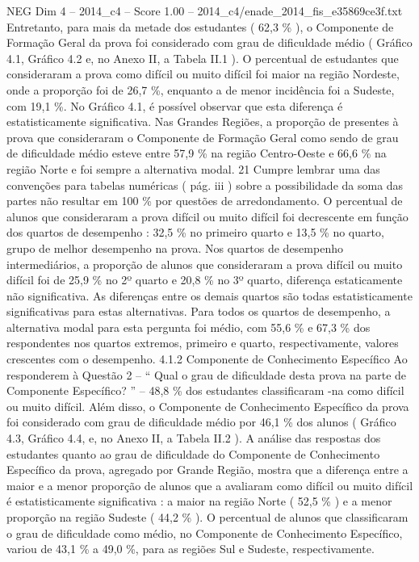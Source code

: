 \begin{textsample}{NEG Dim 4 – 2014\_c4 – Score 1.00 – 2014\_c4/enade\_2014\_fis\_e35869ce3f.txt}
Entretanto, para mais da metade dos estudantes ( 62,3 \% ), o Componente de Formação Geral da prova foi considerado com grau de dificuldade médio ( Gráfico 4.1, Gráfico 4.2 e, no Anexo II, a Tabela II.1 ).
O percentual de estudantes que consideraram a prova como difícil ou muito difícil foi maior na região Nordeste, onde a proporção foi de 26,7 \%, enquanto a de menor incidência foi a Sudeste, com 19,1 \%.
No Gráfico 4.1, é possível observar que esta diferença é estatisticamente significativa.
Nas Grandes Regiões, a proporção de presentes à prova que consideraram o Componente de Formação Geral como sendo de grau de dificuldade médio esteve entre 57,9 \% na região Centro-Oeste e 66,6 \% na região Norte e foi sempre a alternativa modal. 21 Cumpre lembrar uma das convenções para tabelas numéricas ( pág. iii ) sobre a possibilidade da soma das partes não resultar em 100 \% por questões de arredondamento.
O percentual de alunos que consideraram a prova difícil ou muito difícil foi decrescente em função dos quartos de desempenho : 32,5 \% no primeiro quarto e 13,5 \% no quarto, grupo de melhor desempenho na prova.
Nos quartos de desempenho intermediários, a proporção de alunos que consideraram a prova difícil ou muito difícil foi de 25,9 \% no 2º quarto e 20,8 \% no 3º quarto, diferença estaticamente não significativa.
As diferenças entre os demais quartos são todas estatisticamente significativas para estas alternativas.
Para todos os quartos de desempenho, a alternativa modal para esta pergunta foi médio, com 55,6 \% e 67,3 \% dos respondentes nos quartos extremos, primeiro e quarto, respectivamente, valores crescentes com o desempenho. 4.1.2 Componente de Conhecimento Específico Ao responderem à Questão 2 – “ Qual o grau de dificuldade desta prova na parte de Componente Específico? ” – 48,8 \% dos estudantes classificaram -na como difícil ou muito difícil.
Além disso, o Componente de Conhecimento Específico da prova foi considerado com grau de dificuldade médio por 46,1 \% dos alunos ( Gráfico 4.3, Gráfico 4.4, e, no Anexo II, a Tabela II.2 ).
A análise das respostas dos estudantes quanto ao grau de dificuldade do Componente de Conhecimento Específico da prova, agregado por Grande Região, mostra que a diferença entre a maior e a menor proporção de alunos que a avaliaram como difícil ou muito difícil é estatisticamente significativa : a maior na região Norte ( 52,5 \% ) e a menor proporção na região Sudeste ( 44,2 \% ).
O percentual de alunos que classificaram o grau de dificuldade como médio, no Componente de Conhecimento Específico, variou de 43,1 \% a 49,0 \%, para as regiões Sul e Sudeste, respectivamente.

\end{textsample}
